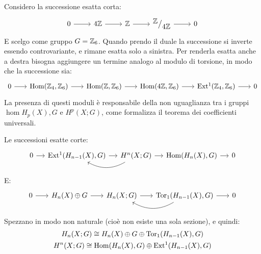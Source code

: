 \begin{example}
  Considero la successione esatta corta:
  \[
    \begin{tikzcd}
      0 \rar & 4 \Z \rar & \Z \rar & \quot{\Z}{4\Z} \rar & 0
    \end{tikzcd}
  \]
  E scelgo come gruppo $ G = \mathbb{Z}_6 $.
  Quando prendo il duale la successione si inverte essendo controvariante,
  e rimane esatta solo a sinistra. Per renderla esatta anche a destra bisogna
  aggiungere un termine analogo al modulo di torsione, in modo che la successione
  sia:
  \[
    \begin{tikzcd}[nodes = {column sep = 18 pt}]
      0 \rar & \hom{\Z_4, \Z_6} \rar & \hom{\Z, \Z_6} \rar & \hom{4\Z, \Z_6} \rar & \ext{\Z_4, \Z_6} \rar & 0
    \end{tikzcd}
  \]
  La presenza di questi moduli è responsabile della non uguaglianza tra i gruppi
  $ \hom{H_p(X), G} $ e $ H^p(X ; G) $, come formalizza il teorema dei
  coefficienti universali.
\end{example}
\begin{theorem}
  Le successioni esatte corte:
  \[
    \begin{tikzcd}[nodes = {column sep = 12 pt}]
      0 \rar & \ext{H_{n-1}(X), G} \rar & H^n(X;G) \arrow[bend left]{l}{} \rar & \hom{H_n(X), G} \rar & 0
    \end{tikzcd}
  \]
  E:
  \[
    \begin{tikzcd}[nodes = {column sep = 18 pt}]
      0 \rar & H_n(X) \oplus G \rar & H_n(X; G) \rar & \arrow[bend left]{l}{} \tor{H_{n-1}(X), G} \rar & 0
    \end{tikzcd}
  \]
  Spezzano in modo non naturale (cioè non esiste una sola sezione), e quindi:
  \begin{gather*}
    H_n(X; G) \cong H_n(X) \oplus G \oplus \mathrm{Tor_1}( H_{n-1}(X), G) \\
    H^n(X; G) \cong \mathrm{Hom}( H_n(X), G) \oplus \mathrm{Ext^1}( H_{n-1}(X), G)
  \end{gather*}
\end{theorem}
%
%
